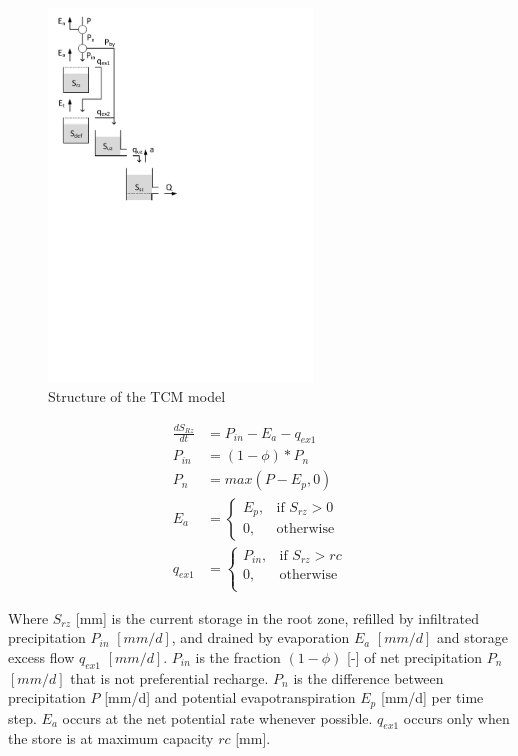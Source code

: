 { 																	%
\begin{figure}
\includegraphics[trim=1cm 14.5cm 7cm 1cm,width=7cm,keepaspectratio]{./AppA_files/25_schematic.pdf}
\caption{Structure of the TCM model} \label{fig:25_schematic}
\end{figure}

\begin{align}
	\frac{dS_{Rz}}{dt} &= P_{in}-E_a-q_{ex1} \\
	P_{in} &= (1-\phi)*P_n \\
	P_n &= max(P-E_p,0)\\
	E_a &= 
	\begin{cases}
		E_p, & \text{if } S_{rz} > 0 \\
		0, & \text{otherwise}
	\end{cases}\\
	q_{ex1} &= \begin{cases}
		P_{in}, &\text{if } S_{rz} > rc \\
		0, & \text{otherwise} \\
	\end{cases} 
\end{align}

Where $S_{rz}$ [mm] is the current storage in the root zone, refilled by infiltrated precipitation $P_{in}$ $[mm/d]$, and drained by evaporation $E_a$ $[mm/d]$ and storage excess flow $q_{ex1}$ $[mm/d]$. 
$P_{in}$ is the fraction $(1-\phi)$ [-] of net precipitation $P_n$ $[mm/d]$ that is not preferential recharge. 
$P_n$ is the difference between precipitation $P$ [mm/d] and potential evapotranspiration $E_p$ [mm/d] per time step. 
$E_a$ occurs at the net potential rate whenever possible.
$q_{ex1}$ occurs only when the store is at maximum capacity $rc$ [mm].

} %

